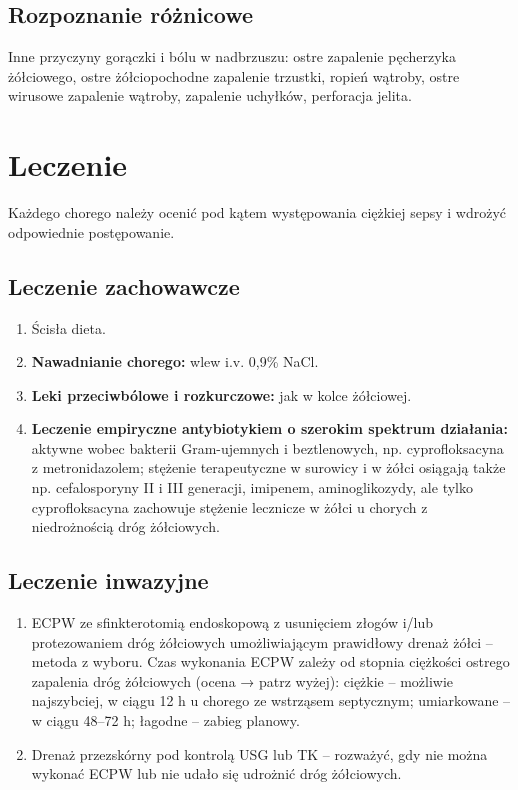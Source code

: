\subsection{Rozpoznanie różnicowe}

Inne przyczyny gorączki i bólu w nadbrzuszu: ostre zapalenie pęcherzyka żółciowego, ostre żółciopochodne zapalenie trzustki, ropień wątroby, ostre wirusowe zapalenie wątroby, zapalenie uchyłków, perforacja jelita.

\section{Leczenie}

Każdego chorego należy ocenić pod kątem występowania ciężkiej sepsy i wdrożyć odpowiednie postępowanie.

\subsection{Leczenie zachowawcze}

\begin{enumerate}
    \item Ścisła dieta.

\item \textbf{Nawadnianie chorego:} wlew i.v. 0,9\% NaCl.

\item \textbf{Leki przeciwbólowe i rozkurczowe:} jak w kolce żółciowej.

\item \textbf{Leczenie empiryczne antybiotykiem o szerokim spektrum działania:} aktywne wobec bakterii Gram-ujemnych i beztlenowych, np. cyprofloksacyna z metronidazolem; stężenie terapeutyczne w surowicy i w żółci osiągają także np. cefalosporyny II i III generacji, imipenem, aminoglikozydy, ale tylko cyprofloksacyna zachowuje stężenie lecznicze w żółci u chorych z niedrożnością dróg żółciowych.
\end{enumerate}

\subsection{Leczenie inwazyjne}

\begin{enumerate}
    \item ECPW ze sfinkterotomią endoskopową z usunięciem złogów i/lub  protezowaniem dróg żółciowych umożliwiającym prawidłowy drenaż żółci – metoda z wyboru. 
    Czas wykonania ECPW zależy od stopnia ciężkości ostrego zapalenia dróg żółciowych (ocena → patrz wyżej): ciężkie – możliwie najszybciej, w ciągu 12 h u chorego ze wstrząsem septycznym; umiarkowane – w ciągu 48–72 h; łagodne – zabieg planowy.

    \item Drenaż przezskórny pod kontrolą USG lub TK – rozważyć, gdy nie można wykonać ECPW lub nie udało się udrożnić dróg żółciowych.
\end{enumerate}